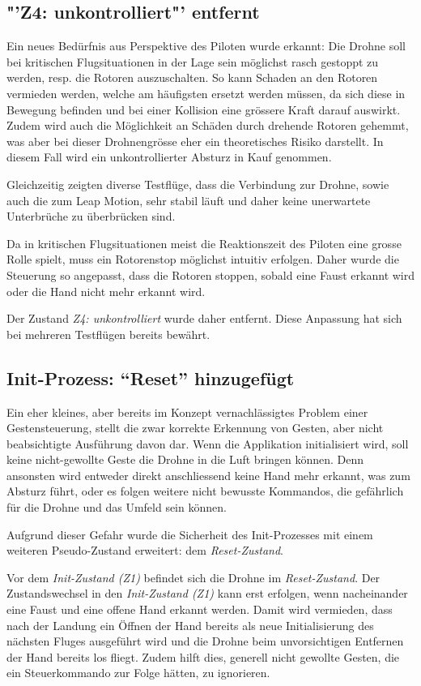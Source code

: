 \subsection{"'Z4: unkontrolliert"' entfernt}
Ein neues Bedürfnis aus Perspektive des Piloten wurde erkannt: Die Drohne soll bei kritischen Flugsituationen in der Lage sein möglichst rasch gestoppt zu werden, resp. die Rotoren auszuschalten.
So kann Schaden an den Rotoren vermieden werden, welche am häufigsten ersetzt werden müssen, da sich diese in Bewegung befinden und bei einer Kollision eine grössere Kraft darauf auswirkt.
Zudem wird auch die Möglichkeit an Schäden durch drehende Rotoren gehemmt, was aber bei dieser Drohnengrösse eher ein theoretisches Risiko darstellt.
In diesem Fall wird ein unkontrollierter Absturz in Kauf genommen.

Gleichzeitig zeigten diverse Testflüge, dass die Verbindung zur Drohne, sowie auch die zum Leap Motion, sehr stabil läuft und daher keine unerwartete Unterbrüche zu überbrücken sind.

Da in kritischen Flugsituationen meist die Reaktionszeit des Piloten eine grosse Rolle spielt, muss ein Rotorenstop möglichst intuitiv erfolgen.
Daher wurde die Steuerung so angepasst, dass die Rotoren stoppen, sobald eine Faust erkannt wird oder die Hand nicht mehr erkannt wird.

Der Zustand \textit{Z4: unkontrolliert} wurde daher entfernt.
Diese Anpassung hat sich bei mehreren Testflügen bereits bewährt.

\subsection{Init-Prozess: "`Reset"' hinzugefügt}
Ein eher kleines, aber bereits im Konzept vernachlässigtes Problem einer Gestensteuerung, stellt die zwar korrekte Erkennung von Gesten, aber nicht beabsichtigte Ausführung davon dar.
Wenn die Applikation initialisiert wird, soll keine nicht-gewollte  Geste die Drohne in die Luft bringen können.
Denn ansonsten wird entweder direkt anschliessend keine Hand mehr erkannt, was zum Absturz führt, oder es folgen weitere nicht bewusste Kommandos, die gefährlich für die Drohne und das Umfeld sein können.

Aufgrund dieser Gefahr wurde die Sicherheit des Init-Prozesses mit einem weiteren Pseudo-Zustand erweitert: dem \textit{Reset-Zustand}.

Vor dem \textit{Init-Zustand (Z1)} befindet sich die Drohne im \textit{Reset-Zustand}. Der Zustandswechsel in den \textit{Init-Zustand (Z1)} kann erst erfolgen, wenn nacheinander eine Faust und eine offene Hand erkannt werden.
Damit wird vermieden, dass nach der Landung ein Öffnen der Hand bereits als neue Initialisierung des nächsten Fluges ausgeführt wird und die Drohne beim unvorsichtigen Entfernen der Hand bereits los fliegt.
Zudem hilft dies, generell nicht gewollte Gesten, die ein Steuerkommando zur Folge hätten, zu ignorieren.

